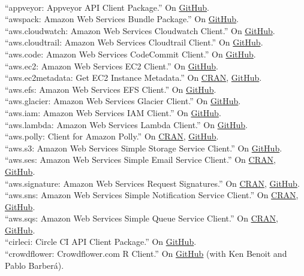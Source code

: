 \documentclass[12pt]{article}
\newcommand{\topic}[1]{\pagebreak[3]\indent {\color{lg}{\footnotesize #1 }}\\}
\newcommand{\entry}[1]{\indent {\color{lg}\guillemotright}\hspace{2pt}#1\vspace{.25em}\\}
\begin{document}
	\topic{R packages contributed to the cloudyr project}
	\entry{``appveyor: Appveyor API Client Package.'' On \href{https://github.com/cloudyr/appveyor}{GitHub}.}
	\entry{``awspack: Amazon Web Services Bundle Package.'' On \href{https://github.com/cloudyr/awspack}{GitHub}.}
	\entry{``aws.cloudwatch: Amazon Web Services Cloudwatch Client.'' On \href{https://github.com/cloudyr/aws.cloudwatch}{GitHub}.}
	\entry{``aws.cloudtrail: Amazon Web Services Cloudtrail Client.'' On \href{https://github.com/cloudyr/aws.cloudtrail}{GitHub}.}
	\entry{``aws.code: Amazon Web Services CodeCommit Client.'' On \href{https://github.com/cloudyr/aws.code}{GitHub}.}
	\entry{``aws.ec2: Amazon Web Services EC2 Client.'' On \href{https://github.com/cloudyr/aws.ec2}{GitHub}.}
	\entry{``aws.ec2metadata: Get EC2 Instance Metadata.'' On \href{https://cran.r-project.org/package=aws.ec2metadata}{CRAN}, \href{https://github.com/cloudyr/aws.ec2metadata}{GitHub}.}
	\entry{``aws.efs: Amazon Web Services EFS Client.'' On \href{https://github.com/cloudyr/aws.efs}{GitHub}.}
	\entry{``aws.glacier: Amazon Web Services Glacier Client.'' On \href{https://github.com/cloudyr/aws.glacier}{GitHub}.}
	\entry{``aws.iam: Amazon Web Services IAM Client.'' On \href{https://github.com/cloudyr/aws.iam}{GitHub}.}
	\entry{``aws.lambda: Amazon Web Services Lambda Client.'' On \href{https://github.com/cloudyr/aws.lambda}{GitHub}.}
	\entry{``aws.polly: Client for Amazon Polly.'' On \href{https://cran.r-project.org/package=polly}{CRAN}, \href{https://github.com/cloudyr/aws.polly}{GitHub}.}
	\entry{``aws.s3: Amazon Web Services Simple Storage Service Client.'' On \href{https://github.com/cloudyr/aws.s3}{GitHub}.}
	\entry{``aws.ses: Amazon Web Services Simple Email Service Client.'' On \href{https://cran.r-project.org/package=aws.ses}{CRAN}, \href{https://github.com/cloudyr/aws.ses}{GitHub}.}
	\entry{``aws.signature: Amazon Web Services Request Signatures.'' On \href{https://cran.r-project.org/package=aws.signature}{CRAN}, \href{https://github.com/cloudyr/aws.signature}{GitHub}.}
	\entry{``aws.sns: Amazon Web Services Simple Notification Service Client.'' On \href{https://cran.r-project.org/package=aws.sns}{CRAN}, \href{https://github.com/cloudyr/aws.sns}{GitHub}.}
	\entry{``aws.sqs: Amazon Web Services Simple Queue Service Client.'' On \href{https://cran.r-project.org/package=aws.sqs}{CRAN}, \href{https://github.com/cloudyr/aws.sqs}{GitHub}.}
	\entry{``cirleci: Circle CI API Client Package.'' On \href{https://github.com/cloudyr/circleci}{GitHub}.}
	\entry{``crowdflower: Crowdflower.com R Client.'' On \href{https://github.com/cloudyr/crowdflower}{GitHub} (with Ken Benoit and Pablo Barber\'{a}).}
\end{document}

